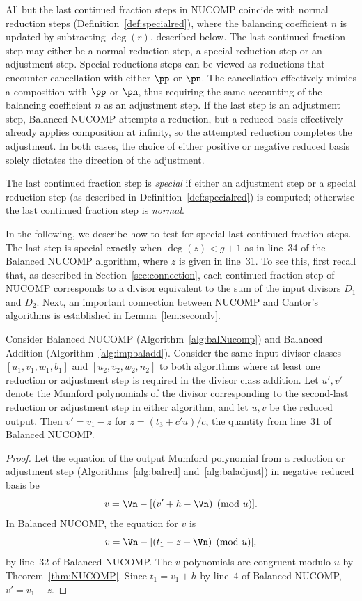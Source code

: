 All but the last continued fraction steps in NUCOMP coincide with normal
reduction steps (Definition~\ref{def:specialred}), where the balancing
coefficient $n$ is updated by subtracting $\deg(r)$, described  below. The last
continued fraction step may either be a normal reduction step, a special
reduction step or an adjustment step. Special reductions steps can be viewed as
reductions that encounter cancellation with either $\pp$ or $\pn$. The
cancellation effectively mimics a composition with $\pp$ or $\pn$, thus
requiring the same accounting of the balancing coefficient $n$ as an adjustment
step. If the last step is an adjustment step, Balanced NUCOMP attempts a
reduction, but a reduced basis effectively already applies composition at
infinity, so the attempted reduction completes the adjustment. In both cases,
the choice of either positive or negative reduced basis solely dictates the
direction of the adjustment. 

\bd
The last continued fraction step is \emph{special} if either an adjustment step
or a special reduction step (as described in Definition~\ref{def:specialred}) is
computed; otherwise the last continued fraction step is \emph{normal}. 
\ed

In the following, we describe how to test for special last continued fraction
steps. The last step is special exactly when $\deg(z) < g+1$ as in
line~34 of the Balanced NUCOMP algorithm, where $z$ is given in line~31.  To see
this, first recall that, as described in Section~\ref{sec:connection}, each
continued fraction step of NUCOMP corresponds to a divisor equivalent to the sum
of the input divisors $D_1$ and $D_2$.  Next, an important connection between
NUCOMP and Cantor's algorithms is established in Lemma~\ref{lem:secondv}.


\bl\label{lem:secondv}
Consider Balanced NUCOMP (Algorithm~\ref{alg:balNucomp}) and Balanced Addition
(Algorithm~\ref{alg:impbaladd}). Consider the same input divisor classes
$[u_1,v_1,w_1,b_1]$ and $[u_2,v_2,w_2,n_2]$ to both algorithms where at least
one reduction or adjustment step is required in the divisor class addition. Let
$u',v'$ denote the Mumford polynomials of the divisor corresponding to the
second-last reduction or adjustment step in either algorithm, and let $u,v$ be
the reduced output.  Then $v' = v_1 - z$ for  $z = (t_3 + c'u)/c$, the quantity
from line~31 of Balanced NUCOMP.

\begin{proof}
Let the equation of the output Mumford polynomial from a reduction or adjustment
step (Algorithms~\ref{alg:balred} and~\ref{alg:baladjust}) in negative reduced
basis be $$v = \Vn - [(v' + h - \Vn) \pmod{u}].$$ In Balanced NUCOMP, the
equation for $v$ is $$v = \Vn - [(t_1 - z + \Vn) \pmod{u}],$$ by line~32 of
Balanced NUCOMP. The $v$ polynomials are congruent modulo $u$ by
Theorem~\ref{thm:NUCOMP}. Since $t_1 = v_1 + h$ by line~4 of Balanced NUCOMP,
$v' = v_1 - z$.
\end{proof}
\el



